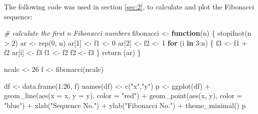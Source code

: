 \documentclass[smallextended]{svjour3}       %
\newenvironment{Shaded}{\begin{snugshade}}{\end{snugshade}}
\newcommand{\AttributeTok}[1]{\textcolor[rgb]{0.77,0.63,0.00}{#1}}
\newcommand{\CommentTok}[1]{\textcolor[rgb]{0.56,0.35,0.01}{\textit{#1}}}
\newcommand{\ControlFlowTok}[1]{\textcolor[rgb]{0.13,0.29,0.53}{\textbf{#1}}}
\newcommand{\DecValTok}[1]{\textcolor[rgb]{0.00,0.00,0.81}{#1}}
\newcommand{\FunctionTok}[1]{\textcolor[rgb]{0.00,0.00,0.00}{#1}}
\newcommand{\NormalTok}[1]{#1}
\newcommand{\OtherTok}[1]{\textcolor[rgb]{0.56,0.35,0.01}{#1}}
\newcommand{\SpecialCharTok}[1]{\textcolor[rgb]{0.00,0.00,0.00}{#1}}
\newcommand{\StringTok}[1]{\textcolor[rgb]{0.31,0.60,0.02}{#1}}
\begin{document}
The following code was used in section \ref{sec:2}, to calculate and plot the Fibonacci sequence:

\begin{Shaded}
\begin{Highlighting}[]
\CommentTok{\# calculate the first \textasciigrave{}n\textasciigrave{} Fibonacci numbers}
\NormalTok{fibonacci }\OtherTok{\textless{}{-}} \ControlFlowTok{function}\NormalTok{(n) \{}
  \FunctionTok{stopifnot}\NormalTok{(n }\SpecialCharTok{\textgreater{}} \DecValTok{2}\NormalTok{)}
\NormalTok{  ar }\OtherTok{\textless{}{-}} \FunctionTok{rep}\NormalTok{(}\DecValTok{0}\NormalTok{, n)}
\NormalTok{  ar[}\DecValTok{1}\NormalTok{] }\OtherTok{\textless{}{-}}\NormalTok{ f1 }\OtherTok{\textless{}{-}} \DecValTok{0}
\NormalTok{  ar[}\DecValTok{2}\NormalTok{] }\OtherTok{\textless{}{-}}\NormalTok{ f2 }\OtherTok{\textless{}{-}} \DecValTok{1}
  \ControlFlowTok{for}\NormalTok{ (i }\ControlFlowTok{in} \DecValTok{3}\SpecialCharTok{:}\NormalTok{n) \{}
\NormalTok{    f3 }\OtherTok{\textless{}{-}}\NormalTok{ f1 }\SpecialCharTok{+}\NormalTok{ f2}
\NormalTok{    ar[i] }\OtherTok{\textless{}{-}}\NormalTok{ f3}
\NormalTok{    f1 }\OtherTok{\textless{}{-}}\NormalTok{ f2}
\NormalTok{    f2 }\OtherTok{\textless{}{-}}\NormalTok{ f3}
\NormalTok{  \}}
  \FunctionTok{return}\NormalTok{ (ar)}
\NormalTok{\}}

\NormalTok{ncalc }\OtherTok{\textless{}{-}} \DecValTok{26}
\NormalTok{f }\OtherTok{\textless{}{-}} \FunctionTok{fibonacci}\NormalTok{(ncalc)}

\NormalTok{df }\OtherTok{\textless{}{-}} \FunctionTok{data.frame}\NormalTok{(}\DecValTok{1}\SpecialCharTok{:}\DecValTok{26}\NormalTok{, f)}
\FunctionTok{names}\NormalTok{(df) }\OtherTok{\textless{}{-}} \FunctionTok{c}\NormalTok{(}\StringTok{"x"}\NormalTok{,}\StringTok{"y"}\NormalTok{)}
\NormalTok{p }\OtherTok{\textless{}{-}} \FunctionTok{ggplot}\NormalTok{(df) }\SpecialCharTok{+}
  \FunctionTok{geom\_line}\NormalTok{(}\FunctionTok{aes}\NormalTok{(}\AttributeTok{x =}\NormalTok{ x, }\AttributeTok{y =}\NormalTok{ y), }\AttributeTok{color =} \StringTok{"red"}\NormalTok{) }\SpecialCharTok{+}
  \FunctionTok{geom\_point}\NormalTok{(}\FunctionTok{aes}\NormalTok{(x, y), }\AttributeTok{color =} \StringTok{"blue"}\NormalTok{) }\SpecialCharTok{+}
  \FunctionTok{xlab}\NormalTok{(}\StringTok{"Sequence No."}\NormalTok{) }\SpecialCharTok{+}
  \FunctionTok{ylab}\NormalTok{(}\StringTok{"Fibonacci No."}\NormalTok{) }\SpecialCharTok{+} 
  \FunctionTok{theme\_minimal}\NormalTok{()}
\NormalTok{p}
\end{Highlighting}
\end{Shaded}
\end{document}
